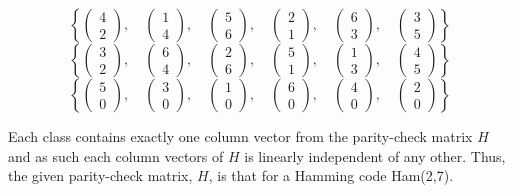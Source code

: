 \[\left\{\begin{pmatrix}
4 \\ 2 
\end{pmatrix},\quad
\begin{pmatrix}
1 \\ 4 
\end{pmatrix},\quad
\begin{pmatrix}
5 \\ 6 
\end{pmatrix},\quad
\begin{pmatrix}
2 \\ 1 
\end{pmatrix},\quad
\begin{pmatrix}
6 \\ 3 
\end{pmatrix},\quad
\begin{pmatrix}
3 \\ 5 
\end{pmatrix}
\right\}
\]
\[\left\{\begin{pmatrix}
3 \\ 2 
\end{pmatrix},\quad
\begin{pmatrix}
6 \\ 4 
\end{pmatrix},\quad
\begin{pmatrix}
2 \\ 6 
\end{pmatrix},\quad
\begin{pmatrix}
5 \\ 1 
\end{pmatrix},\quad
\begin{pmatrix}
1 \\ 3 
\end{pmatrix},\quad
\begin{pmatrix}
4 \\ 5 
\end{pmatrix}
\right\}
\]
\[\left\{\begin{pmatrix}
5 \\ 0 
\end{pmatrix},\quad
\begin{pmatrix}
3 \\ 0 
\end{pmatrix},\quad
\begin{pmatrix}
1 \\ 0 
\end{pmatrix},\quad
\begin{pmatrix}
6 \\ 0 
\end{pmatrix},\quad
\begin{pmatrix}
4 \\ 0 
\end{pmatrix},\quad
\begin{pmatrix}
2 \\ 0 
\end{pmatrix}
\right\}
\]

Each class contains exactly one column vector from the parity-check matrix $H$ and as such each column vectors of $H$ is linearly independent of any other. Thus, the given parity-check matrix, $H$, is that for a Hamming code Ham(2,7).